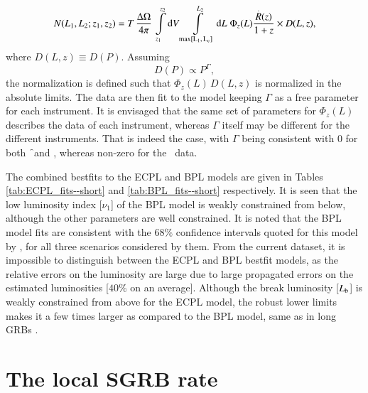 \begin{equation}
N(L_1, L_2; z_1, z_2) = T \, \dfrac{\Delta \Omega}{4 \pi} \,
\intop_{z_1}^{z_2} \dd V
\intop_{\rm{max}[L_1,\, L_c]}^{L_2} \dd L \; \Phi_z(L) \dfrac{\Rdot(z)}{1+z} \times D(L, z),
\label{eq:introduction_of_D}
\end{equation} where $D(L, z) \equiv D(P)$. Assuming
\begin{equation}
D(P) \propto P^{\Gamma},
\label{eq:form_of_D}
\end{equation} the normalization is defined such that $ \Phi_z(L) \, D(L,z) $ is normalized in the absolute limits. The data are then fit to the model keeping $\Gamma$ as a free parameter for each instrument. It is envisaged that the same set of parameters for $\Phi_z(L)$ describes the data of each instrument, whereas $\Gamma$ itself may be different for the different instruments. That is indeed the case, with $\Gamma$ being consistent with $0$ for both \f\ and \s, whereas non-zero for the \B\ data.

The combined bestfits to the ECPL and BPL models are given in Tables \ref{tab:ECPL_fits--short} and \ref{tab:BPL_fits--short} respectively. It is seen that the low luminosity index [$\nu_1$] of the BPL model is weakly constrained from below, although the other parameters are well constrained. It is noted that the BPL model fits are consistent with the $68 \%$ confidence intervals quoted for this model by , for all three scenarios considered by them. From the current dataset, it is impossible to distinguish between the ECPL and BPL bestfit models, as the relative errors on the luminosity are large due to large propagated errors on the estimated luminosities [$40 \%$ on an average]. Although the break luminosity [$L_{\rm{b}}$] is weakly constrained from above for the ECPL model, the robust lower limits makes it a few times larger as compared to the BPL model, same as in long GRBs .



\section{The local SGRB rate}
\label{sec:local_SGRB_rate}

